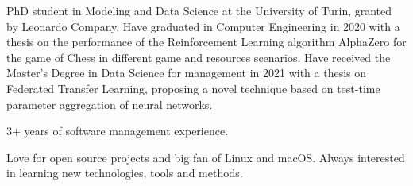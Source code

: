 

\begin{cvparagraph}

PhD student in Modeling and Data Science at the University of Turin, granted by Leonardo Company.
Have graduated in Computer Engineering in 2020 with a thesis on the performance of the Reinforcement Learning algorithm AlphaZero for the game of Chess in different game and resources scenarios.
Have received the Master’s Degree in Data Science for management in 2021 with a thesis on Federated Transfer Learning, proposing a novel technique based on test-time parameter aggregation of neural networks.


3+ years of software management experience.


Love for open source projects and big fan of Linux and macOS. Always interested in learning new technologies, tools and methods.

\end{cvparagraph}
